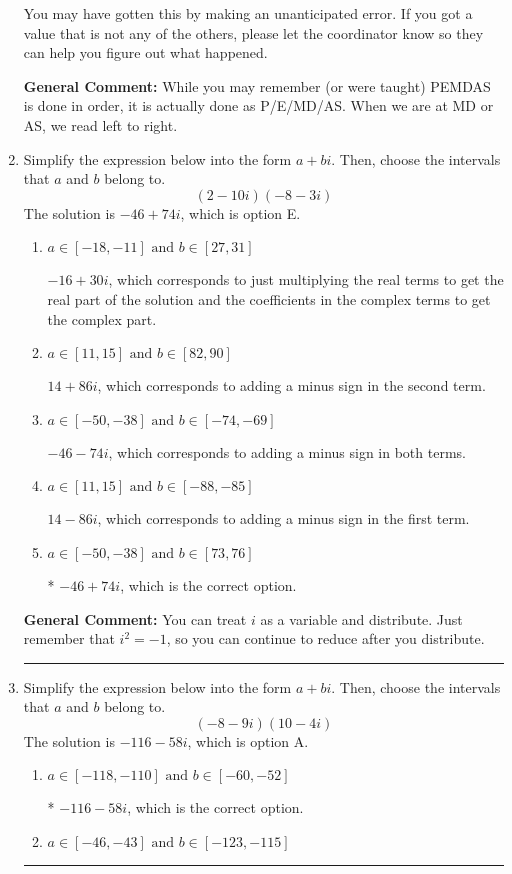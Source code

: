 \documentclass{extbook}[14pt]
\newcommand{\litem}[1]{\item #1

\rule{\textwidth}{0.4pt}}
\begin{document}
\begin{enumerate}
{\begin{enumerate}[label=\Alph*.]
 You may have gotten this by making an unanticipated error. If you got a value that is not any of the others, please let the coordinator know so they can help you figure out what happened.
\end{enumerate}

\textbf{General Comment:} While you may remember (or were taught) PEMDAS is done in order, it is actually done as P/E/MD/AS. When we are at MD or AS, we read left to right.
}
\litem{
Simplify the expression below into the form $a+bi$. Then, choose the intervals that $a$ and $b$ belong to.
\[ (2 - 10 i)(-8 - 3 i) \]The solution is \( -46 + 74 i \), which is option E.\begin{enumerate}[label=\Alph*.]
\item \( a \in [-18, -11] \text{ and } b \in [27, 31] \)

 $-16 + 30 i$, which corresponds to just multiplying the real terms to get the real part of the solution and the coefficients in the complex terms to get the complex part.
\item \( a \in [11, 15] \text{ and } b \in [82, 90] \)

 $14 + 86 i$, which corresponds to adding a minus sign in the second term.
\item \( a \in [-50, -38] \text{ and } b \in [-74, -69] \)

 $-46 - 74 i$, which corresponds to adding a minus sign in both terms.
\item \( a \in [11, 15] \text{ and } b \in [-88, -85] \)

 $14 - 86 i$, which corresponds to adding a minus sign in the first term.
\item \( a \in [-50, -38] \text{ and } b \in [73, 76] \)

* $-46 + 74 i$, which is the correct option.
\end{enumerate}

\textbf{General Comment:} You can treat $i$ as a variable and distribute. Just remember that $i^2=-1$, so you can continue to reduce after you distribute.
}
\litem{
Simplify the expression below into the form $a+bi$. Then, choose the intervals that $a$ and $b$ belong to.
\[ (-8 - 9 i)(10 - 4 i) \]The solution is \( -116 - 58 i \), which is option A.\begin{enumerate}[label=\Alph*.]
\item \( a \in [-118, -110] \text{ and } b \in [-60, -52] \)

* $-116 - 58 i$, which is the correct option.
\item \( a \in [-46, -43] \text{ and } b \in [-123, -115] \)


\end{enumerate}}
\end{enumerate}
\end{document}
